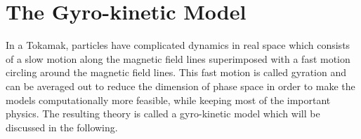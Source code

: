 

\section{The Gyro-kinetic Model}
\label{sec:introduction}

In a Tokamak, particles have complicated dynamics in real space which consists of a slow motion along the magnetic field lines superimposed with a fast motion circling around the magnetic field lines. This fast motion is called gyration and can be averaged out to reduce the dimension of phase space in order to make the models computationally more feasible, while keeping most of the important physics. The resulting theory is called a gyro-kinetic model which will be discussed in the following.\\

